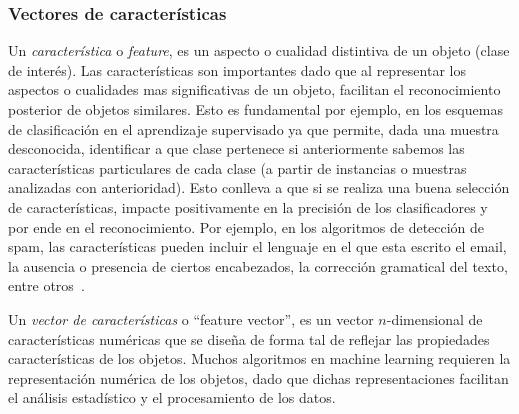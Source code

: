 \subsubsection{Vectores de características} \label{subsection:feature}

	Un \textit{característica} o \textit{feature}, es un aspecto o cualidad distintiva de un objeto (clase de interés). Las características son importantes dado que al representar los aspectos o cualidades mas significativas de un objeto, facilitan el reconocimiento posterior de objetos similares. Esto es fundamental por ejemplo, en los esquemas de clasificación en el aprendizaje supervisado ya que permite, dada una muestra desconocida, identificar a que clase pertenece si anteriormente sabemos las características particulares de cada clase (a partir de instancias o muestras analizadas con anterioridad). Esto conlleva a que si se realiza una buena selección de características, impacte positivamente en la precisión de los clasificadores y por ende en el reconocimiento. Por ejemplo, en los algoritmos de detección de spam, las características pueden incluir el lenguaje en el que esta escrito el email, la ausencia o presencia de ciertos encabezados, la corrección gramatical del texto, entre otros~\cite{SpamPaper}.

	Un \textit{vector de características} o ``feature vector'', es un  vector $n$-dimensional de características numéricas que se diseña de forma tal de reflejar las propiedades características de los objetos. Muchos algoritmos en machine learning requieren la representación numérica de los objetos, dado que dichas representaciones facilitan el análisis estadístico y el procesamiento de los datos.
		
	
		
	

